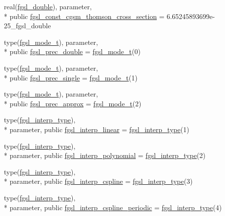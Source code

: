 \begin{DoxyCompactItemize}
real(\hyperlink{classfgsl_a9af5113378e0f000eb479d3f90196ddf}{fgsl\-\_\-double}), parameter, \\*
public \hyperlink{classfgsl_a1581b093a3a9c09cff62c4bee45c1dcd}{fgsl\-\_\-const\-\_\-cgsm\-\_\-thomson\-\_\-cross\-\_\-section} = 6.\-65245893699e-\/25\-\_\-fgsl\-\_\-double
\item 
type(\hyperlink{structfgsl_1_1fgsl__mode__t}{fgsl\-\_\-mode\-\_\-t}), parameter, \\*
public \hyperlink{classfgsl_a974fb113c1c5dced8257e1eae0def683}{fgsl\-\_\-prec\-\_\-double} = \hyperlink{structfgsl_1_1fgsl__mode__t}{fgsl\-\_\-mode\-\_\-t}(0)
\item 
type(\hyperlink{structfgsl_1_1fgsl__mode__t}{fgsl\-\_\-mode\-\_\-t}), parameter, \\*
public \hyperlink{classfgsl_ac6801c472f4316aa060668c157db61bd}{fgsl\-\_\-prec\-\_\-single} = \hyperlink{structfgsl_1_1fgsl__mode__t}{fgsl\-\_\-mode\-\_\-t}(1)
\item 
type(\hyperlink{structfgsl_1_1fgsl__mode__t}{fgsl\-\_\-mode\-\_\-t}), parameter, \\*
public \hyperlink{classfgsl_ab6d5bd94526f9dacea9ce2293a66c824}{fgsl\-\_\-prec\-\_\-approx} = \hyperlink{structfgsl_1_1fgsl__mode__t}{fgsl\-\_\-mode\-\_\-t}(2)
\item 
type(\hyperlink{structfgsl_1_1fgsl__interp__type}{fgsl\-\_\-interp\-\_\-type}), \\*
parameter, public \hyperlink{classfgsl_a56a303cdb0b7046c3d8bfd1ebbf77bbc}{fgsl\-\_\-interp\-\_\-linear} = \hyperlink{structfgsl_1_1fgsl__interp__type}{fgsl\-\_\-interp\-\_\-type}(1)
\item 
type(\hyperlink{structfgsl_1_1fgsl__interp__type}{fgsl\-\_\-interp\-\_\-type}), \\*
parameter, public \hyperlink{classfgsl_aedbdc4347cb86cafe5bd0a2da8e38648}{fgsl\-\_\-interp\-\_\-polynomial} = \hyperlink{structfgsl_1_1fgsl__interp__type}{fgsl\-\_\-interp\-\_\-type}(2)
\item 
type(\hyperlink{structfgsl_1_1fgsl__interp__type}{fgsl\-\_\-interp\-\_\-type}), \\*
parameter, public \hyperlink{classfgsl_aa03de96a2a37daa1c2e464b98e198eb3}{fgsl\-\_\-interp\-\_\-cspline} = \hyperlink{structfgsl_1_1fgsl__interp__type}{fgsl\-\_\-interp\-\_\-type}(3)
\item 
type(\hyperlink{structfgsl_1_1fgsl__interp__type}{fgsl\-\_\-interp\-\_\-type}), \\*
parameter, public \hyperlink{classfgsl_a383cf4d39acd2faf1d29a204d9349043}{fgsl\-\_\-interp\-\_\-cspline\-\_\-periodic} = \hyperlink{structfgsl_1_1fgsl__interp__type}{fgsl\-\_\-interp\-\_\-type}(4)

\end{DoxyCompactItemize}
